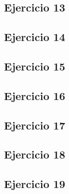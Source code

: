 \subsection{Ejercicio 13}
\subsection{Ejercicio 14}
\subsection{Ejercicio 15}
\subsection{Ejercicio 16}
\subsection{Ejercicio 17}
\subsection{Ejercicio 18}
\subsection{Ejercicio 19}